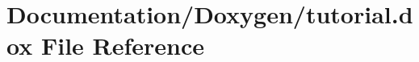 \hypertarget{tutorial_8dox}{}\section{Documentation/\+Doxygen/tutorial.dox File Reference}
\label{tutorial_8dox}
